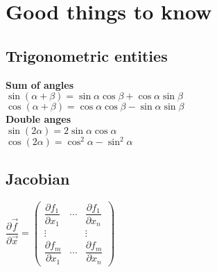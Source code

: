 \section{Good things to know}
\subsection*{Trigonometric entities}
\textbf{Sum of angles}\\
$\sin(\alpha + \beta) = \sin \alpha \cos \beta + \cos \alpha \sin
\beta$\\
$\cos(\alpha + \beta) = \cos \alpha \cos \beta - \sin \alpha \sin
\beta$\\
\textbf{Double anges}\\
$\sin(2 \alpha) = 2 \sin \alpha \cos \alpha$\\
$\cos(2 \alpha) = \cos^2 \alpha - \sin^2 \alpha$

\subsection{Jacobian}
$ \dfrac{\partial \vec{f}}{\partial{\vec{x}}}
=
\begin{pmatrix}
  \dfrac{\partial {f_1}}{\partial{x_1}} &
  \cdots &
  \dfrac{\partial {f_1}}{\partial{x_n}}\\
  \vdots & & \vdots \\
  \dfrac{\partial {f_m}}{\partial{x_1}} &
  \cdots &
  \dfrac{\partial {f_m}}{\partial{x_n}}
\end{pmatrix}
$\\
